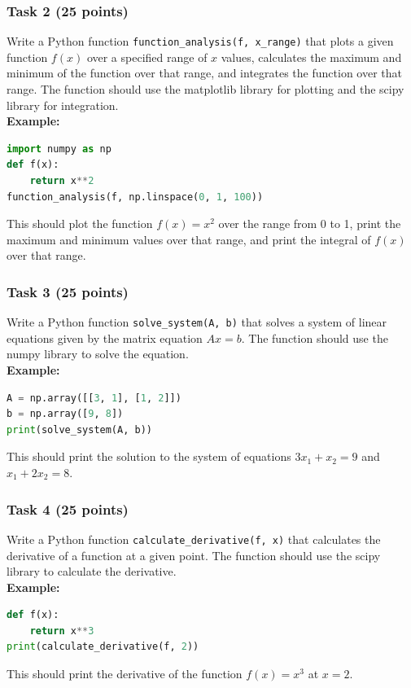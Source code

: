 \documentclass[12pt]{article}
\begin{document}
\subsubsection{Task 2 (25 points)}
Write a Python function \texttt{function\_analysis(f, x\_range)} that plots a given function $f(x)$ over a specified range of $x$ values, calculates the maximum and minimum of the function over that range, and integrates the function over that range. The function should use the matplotlib library for plotting and the scipy library for integration. \\
\textbf{Example:}
\begin{lstlisting}[language=Python]
import numpy as np
def f(x):
    return x**2
function_analysis(f, np.linspace(0, 1, 100))
\end{lstlisting}
This should plot the function $f(x) = x^2$ over the range from 0 to 1, print the maximum and minimum values over that range, and print the integral of $f(x)$ over that range.

\subsubsection{Task 3 (25 points)}
Write a Python function \texttt{solve\_system(A, b)} that solves a system of linear equations given by the matrix equation $Ax = b$. The function should use the numpy library to solve the equation. \\
\textbf{Example:}
\begin{lstlisting}[language=Python]
A = np.array([[3, 1], [1, 2]])
b = np.array([9, 8])
print(solve_system(A, b))
\end{lstlisting}
This should print the solution to the system of equations $3x_1 + x_2 = 9$ and $x_1 + 2x_2 = 8$.

\subsubsection{Task 4 (25 points)}
Write a Python function \texttt{calculate\_derivative(f, x)} that calculates the derivative of a function at a given point. The function should use the scipy library to calculate the derivative. \\
\textbf{Example:}
\begin{lstlisting}[language=Python]
def f(x):
    return x**3
print(calculate_derivative(f, 2))
\end{lstlisting}
This should print the derivative of the function $f(x) = x^3$ at $x = 2$.
\newpage
\end{document}
